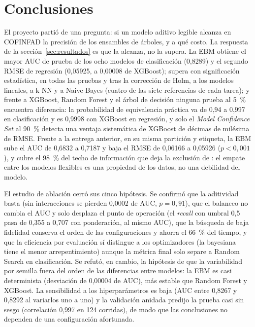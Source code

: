 \section{Conclusiones}
\label{sec:conclusiones}

El proyecto partió de una pregunta: si un modelo aditivo legible alcanza en COFINFAD la precisión de los
ensambles de árboles, y a qué costo. La respuesta de la sección~\ref{sec:resultados} es que la alcanza, no la
supera. La EBM obtiene el mayor AUC de prueba de los ocho modelos de clasificación (0,8289) y el segundo RMSE de
regresión (0,05925, a 0,00008 de XGBoost); supera con significación estadística, en todas las pruebas y tras la
corrección de Holm, a los modelos lineales, a k-NN y a Naive Bayes (cuatro de las siete referencias de cada
tarea); y frente a XGBoost, Random Forest y el árbol de decisión ninguna prueba al 5~\% encuentra diferencia:
la probabilidad de equivalencia práctica va de 0,94 a 0,997 en clasificación y es 0,9998 con XGBoost en
regresión, y solo el \emph{Model Confidence Set} al 90~\% detecta una ventaja sistemática de XGBoost de
décimas de milésima de RMSE. Frente a la entrega anterior, en su misma partición y etiqueta, la EBM sube el AUC
de 0,6832 a 0,7187 y baja el RMSE de 0,06166 a 0,05926 ($p < 0{,}001$), y cubre el 98~\% del techo de
información que deja la exclusión de \ap: el empate entre los modelos flexibles es una propiedad de los datos,
no una debilidad del modelo.

El estudio de ablación cerró sus cinco hipótesis. Se confirmó que la aditividad basta (sin interacciones se
pierden 0,0002 de AUC, $p = 0{,}91$), que el balanceo no cambia el AUC y solo desplaza el punto de operación (el
\emph{recall} con umbral 0,5 pasa de 0,355 a 0,707 con ponderación, al mismo AUC), que la búsqueda de baja
fidelidad conserva el orden de las configuraciones y ahorra el 66~\% del tiempo, y que la eficiencia por
evaluación sí distingue a los optimizadores (la bayesiana tiene el menor arrepentimiento) aunque la métrica
final solo separe a Random Search en clasificación. Se refutó, en cambio, la hipótesis de que la variabilidad
por semilla fuera del orden de las diferencias entre modelos: la EBM es casi determinista (desviación de
0,00004 de AUC), más estable que Random Forest y XGBoost. La sensibilidad a los hiperparámetros es baja (AUC
entre 0,8267 y 0,8292 al variarlos uno a uno) y la validación anidada predijo la prueba casi sin sesgo
(correlación 0,997 en 124 corridas), de modo que las conclusiones no dependen de una configuración afortunada.

